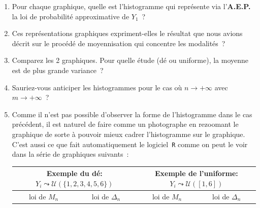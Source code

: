 \documentclass[10pt]{report}
\begin{document}
\begin{exercice}
\begin{enumerate}
\item Pour chaque graphique, quelle est l'histogramme qui représente via l'\textbf{A.E.P.} la loi de probabilité approximative de $Y_1$~? 
\item Ces représentations graphiques expriment-elles le résultat que nous avions décrit sur le procédé de moyennisation qui concentre les modalités~?
\item Comparez les 2 graphiques. Pour quelle étude (dé ou uniforme), la moyenne est de plus grande variance~?
\item Sauriez-vous anticiper les histogrammes pour le cas où $n\to+\infty$ avec $m\to+\infty$~?
\item Comme il n'est pas possible d'observer la forme de l'histogramme dans le cas précédent, il est naturel de faire comme un photographe en rezoomant le graphique de sorte à pouvoir mieux cadrer l'histogramme sur le graphique. C'est aussi ce que fait automatiquement le logiciel~\texttt{R} comme on peut le voir dans la série de graphiques suivants~:\\[0.25cm]
\hspace*{-2.3cm}\begin{tabular}{|c|c|c|c|}\hline
\multicolumn{2}{|c|}{Exemple du dé: $Y_i\leadsto \mathcal{U}(\{1,2,3,4,5,6\})$} & \multicolumn{2}{c|}{Exemple de l'uniforme: $Y_i\leadsto \mathcal{U}([1,6])$}\\\hline
loi de $M_n$ & loi de $\Delta_n$ & loi de $M_n$ & loi de $\Delta_n$\\\hline

\end{tabular}
\end{enumerate}
\end{exercice}
\end{document}
